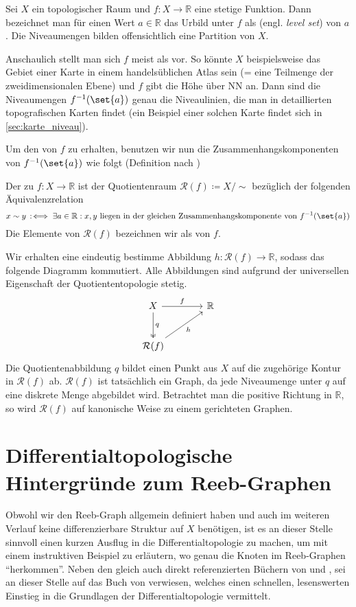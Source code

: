 Sei $X$ ein topologischer Raum und $f \colon X \to \mathbb{R}$ eine stetige Funktion.
Dann bezeichnet man für einen Wert $a \in \mathbb{R}$ das Urbild unter $f$ als  (engl. \emph{level set}) von $a$.
Die Niveaumengen bilden offensichtlich eine Partition von $X$.

Anschaulich stellt man sich $f$ meist als  vor.
So könnte $X$ beispielsweise das Gebiet einer Karte in einem handelsüblichen Atlas sein (= eine Teilmenge der zweidimensionalen Ebene) und $f$ gibt die Höhe über NN an.
Dann sind die Niveaumengen $f^{-1}(\set{a})$ genau die Niveaulinien, die man in detaillierten topografischen Karten findet (ein Beispiel einer solchen Karte findet sich in \cref{sec:karte_niveau}).

Um den  von $f$ zu erhalten, benutzen wir nun die Zusammenhangskomponenten von $f^{-1}(\set{a})$ wie folgt (Definition nach \textcite[.4]{compTopo})

\begin{definition}[{name=[Reeb-Graph]}]
	Der  zu $f \colon X \to \mathbb{R}$ ist der Quotientenraum $\mathcal{R}(f) \coloneqq X/{\sim}$ bezüglich der folgenden Äquivalenzrelation
	\[
		x \sim y \,:\mkern-3mu\iff \exists a \in \mathbb{R} : x,y \text{ liegen in der gleichen Zusammenhangskomponente von } f^{-1}(\set{a})
	\]
	Die Elemente von $\mathcal{R}(f)$ bezeichnen wir als  von $f$.
\end{definition}
Wir erhalten eine eindeutig bestimme Abbildung $h \colon \mathcal{R}(f) \to \mathbb{R}$, sodass das folgende Diagramm kommutiert.
Alle Abbildungen sind aufgrund der universellen Eigenschaft der Quotiententopologie stetig.
\[
	\begin{tikzcd}[sep=large]
		X \rar["f"] \dar["q",two heads] & \mathbb{R} \\
		\mathcal{R}(f) \urar["h"']
	\end{tikzcd}
\]
Die Quotientenabbildung $q$ bildet einen Punkt aus $X$ auf die zugehörige Kontur in $\mathcal{R}(f)$ ab.
$\mathcal{R}(f)$ ist tatsächlich ein Graph, da jede Niveaumenge unter $q$ auf eine diskrete Menge abgebildet wird.
Betrachtet man die positive Richtung in $\mathbb{R}$, so wird $\mathcal{R}(f)$ auf kanonische Weise zu einem gerichteten Graphen.

\section{Differentialtopologische Hintergründe zum Reeb-Graphen} %
\label{sec:background_reeb}
Obwohl wir den Reeb-Graph allgemein definiert haben und auch im weiteren Verlauf keine differenzierbare Struktur auf $X$ benötigen, ist es an dieser Stelle sinnvoll einen kurzen Ausflug in die Differentialtopologie zu machen, um mit einem instruktiven Beispiel zu erläutern, wo genau die Knoten im Reeb-Graphen \enquote{herkommen}.
Neben den gleich auch direkt referenzierten Büchern von \textcite{compTopo} und \textcite{MilnorMorse}, sei an dieser Stelle auf das Buch  von \textcite{Miln} verwiesen, welches einen schnellen, lesenswerten Einstieg in die Grundlagen der Differentialtopologie vermittelt.

